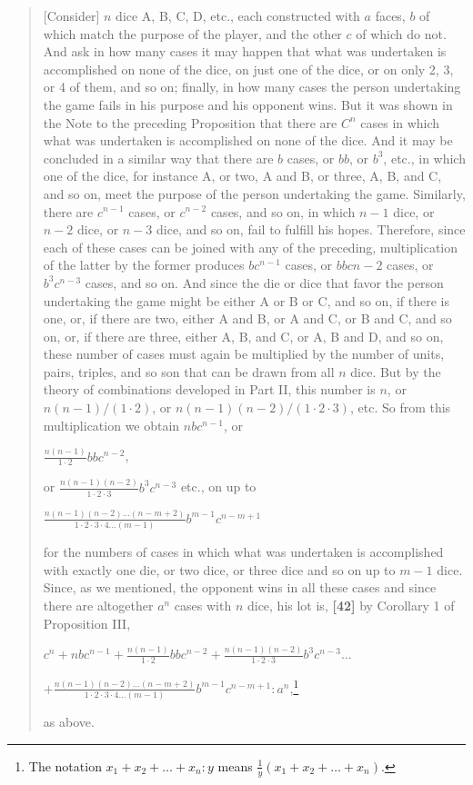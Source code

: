 \begin{quotation}
  [Consider] $n$ dice A, B, C, D, etc., each constructed with $a$ faces, $b$ of which match the purpose of the player, and the other $c$ of which do not. And ask in how many cases it may happen that what was undertaken is accomplished on none of the dice, on just one of the dice, or on only 2, 3, or 4 of them, and so on; finally, in how many cases the person undertaking the game fails in his purpose and his opponent wins. But it was shown in the Note to the preceding Proposition that there are $C^n$ cases in which what was undertaken is accomplished on none of the dice. And it may be concluded in a similar way that there are $b$ cases, or $bb$, or $b^3$, etc., in which one of the dice, for instance A, or two, A and B, or three, A, B, and C, and so on, meet the purpose of the person undertaking the game. Similarly, there are $c^{n-1}$ cases, or $c^{n-2}$ cases, and so on, in which $n-1$ dice, or $n-2$ dice, or $n-3$ dice, and so on, fail to fulfill his hopes. Therefore, since each of these cases can be joined with any of the preceding, multiplication of the latter by the former produces $bc^{n-1}$ cases, or $bbc{n-2}$ cases, or $b^3c^{n-3}$ cases, and so on. And since the die or dice that favor the person undertaking the game might be either A or B or C, and so on, if there is one, or, if there are two, either A and B, or A and C, or B and C, and so on, or, if there are three, either A, B, and C, or A, B and D, and so on, these number of cases must again be multiplied by the number of units, pairs, triples, and so son that can be drawn from all $n$ dice. But by the theory of combinations developed in Part II, this number is $n$, or $n(n-1)/(1\cdot 2)$, or $n(n-1)(n-2)/(1\cdot 2\cdot 3)$, etc. So from this multiplication we obtain $nbc^{n-1}$, or

  
  $\frac{n(n-1)}{1\cdot 2}bbc^{n-2}$,

  or $\frac{n(n-1)(n-2)}{1\cdot 2\cdot 3}b^3c^{n-3}$ etc., on up to

  $\frac{n(n-1)(n-2)\ldots(n-m+2)}{1\cdot 2\cdot 3\cdot 4\ldots(m-1)} b^{m-1} c^{n-m+1}$

  for the numbers of cases in which what was undertaken is accomplished with exactly one die, or two dice, or three dice and so on up to $m-1$ dice. Since, as we mentioned, the opponent wins in all these cases and since there are altogether $a^n$ cases with $n$ dice, his lot is, \textbf{[42]} by Corollary 1 of Proposition III,

  $c^n+nbc^{n-1}+\frac{n(n-1)}{1\cdot 2}bbc^{n-2} + \frac{n(n-1)(n-2)}{1\cdot 2\cdot 3}b^3c^{n-3} \ldots$

  $+\frac{n(n-1)(n-2)\ldots(n-m+2)}{1\cdot 2\cdot 3\cdot 4\ldots(m-1)} b^{m-1}c^{n-m+1} : a^n$,\footnote{The notation $x_1+x_2+\ldots+x_n:y$ means $\tfrac 1y (x_1+x_2+\ldots+x_n)$. }

  as above.
\end{quotation}


